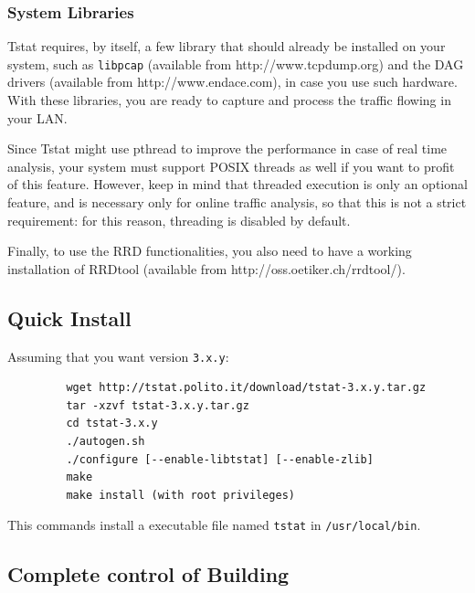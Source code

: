 \documentclass[11pt]{article}
\begin{document}
\subsubsection{System Libraries\label{System_Libraries}}


Tstat requires, by itself, a few library that should
already be installed on your system, such as 
\texttt{libpcap} (available from \textsf{http://www.tcpdump.org}) 
and the DAG drivers (available from \textsf{http://www.endace.com}), 
in case you use such hardware. With these libraries, 
you are ready to capture and process the traffic flowing
in your LAN.



Since Tstat might use pthread to improve the performance in case of real time
analysis, your system must support POSIX threads as well if you want to
profit of this feature. However, keep in mind that threaded execution 
is only an optional feature, and is necessary only for online traffic
analysis, so that this is not a strict requirement: for this reason,
threading is disabled by default.



Finally, to use the RRD functionalities, you also need to have a working
installation of RRDtool (available from \textsf{http://oss.oetiker.ch/rrdtool/}).

\subsection{Quick Install\label{Quick_Install}}


Assuming that you want version \texttt{3.x.y}:

\begin{small}\begin{verbatim}
         wget http://tstat.polito.it/download/tstat-3.x.y.tar.gz
         tar -xzvf tstat-3.x.y.tar.gz
         cd tstat-3.x.y
         ./autogen.sh
         ./configure [--enable-libtstat] [--enable-zlib]
         make
         make install (with root privileges)
\end{verbatim}\end{small} \noindent
This commands install a executable file named \texttt{tstat} in \texttt{/usr/local/bin}.

\subsection{Complete control of Building\label{Complete_control_of_Building}}
\end{document}
